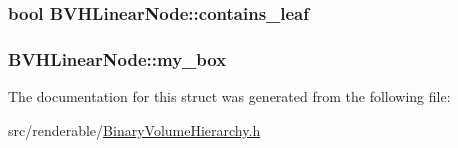 \subsubsection[{\texorpdfstring{contains\+\_\+leaf}{contains_leaf}}]{\setlength{\rightskip}{0pt plus 5cm}bool B\+V\+H\+Linear\+Node\+::contains\+\_\+leaf}\hypertarget{structBVHLinearNode_aabfe3d3f0fa2893fbaa60629baea3cda}{}\label{structBVHLinearNode_aabfe3d3f0fa2893fbaa60629baea3cda}
\subsubsection[{\texorpdfstring{my\+\_\+box}{my_box}}]{ B\+V\+H\+Linear\+Node\+::my\+\_\+box}\hypertarget{structBVHLinearNode_abd02379045550966cdc50a20ea877fa5}{}\label{structBVHLinearNode_abd02379045550966cdc50a20ea877fa5}


The documentation for this struct was generated from the following file\+:\begin{DoxyCompactItemize}
\item 
src/renderable/\hyperlink{BinaryVolumeHierarchy_8h}{Binary\+Volume\+Hierarchy.\+h}\end{DoxyCompactItemize}

